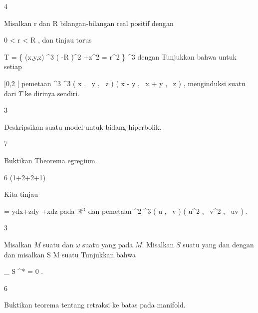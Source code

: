 {4}
{

Misalkan
\mathkor {} {r} {dan} {R} {}
bilangan-bilangan real positif dengan

\mavergleichskette
{\vergleichskette
{ 0
}
{ < }{ r
}
{ < }{ R
}
{    }{
}
{   }{
}
}
{}{}{,}
dan tinjau torus
 {} {}

\mavergleichskettedisp
{\vergleichskette
{ T
}
{ =} { \left\{ (x,y,z) \in \R^3  \mid   \left(   -R  \right)^2 +z^2  = r^2         \right\}
}
{ \subseteq} { \R^3
}
{ } {
}
{ } {
}
}
{}{}{}
dengan
Tunjukkan bahwa untuk setiap

\mavergleichskette
{\vergleichskette
{ \alpha
}
{ \in }{ [0,2 \pi [
}
{  }{
}
{    }{
}
{   }{
}
}
{}{}{}
pemetaan
\maabbeledisp {\Psi_\alpha} {\R^3} {\R^3
} { \left(  x   , \,   y  , \,  z                 \right) } { \left(  x \cos \alpha - y \sin  \alpha   , \,   x \sin \alpha + y \cos  \alpha  , \,  z                 \right)
} {,}
menginduksi suatu
dari $T$ ke dirinya sendiri.

}
{} {}

{3}
{

Deskripsikan suatu model untuk bidang hiperbolik.

}
{} {}

{7}
{

Buktikan Theorema egregium.

}
{} {}

{6 (1+2+2+1)}
{

Kita tinjau

\mavergleichskettedisp
{\vergleichskette
{ \omega
}
{ =} { ydx+zdy +xdz
}
{ } {
}
{ } {
}
{ } {
}
}
{}{}{}
pada ${\mathbb R}^3$ dan pemetaan
\maabbeledisp {\varphi} {\R^2} {\R^3
} { \left(  u   , \,  v                   \right) } { \left( u^2  , \,  v^2  , \,  uv                 \right)
} {.}

}
{} {}

{3}
{

Misalkan $M$ suatu
dan $\omega$ suatu
yang
pada $M$. Misalkan $S$ suatu
yang
dan
 {} {}
dengan
dan misalkan
\maabbdisp {\varphi} { S } { M
} {}
suatu
Tunjukkan bahwa

\mavergleichskettedisp
{\vergleichskette
{
\int_{  S  }   \varphi^*\omega
}
{ =} { 0
}
{ } {
}
{ } {
}
{ } {
}
}
{}{}{.}

}
{} {}

{6}
{

Buktikan teorema tentang retraksi ke batas pada manifold.

}
{} {}
